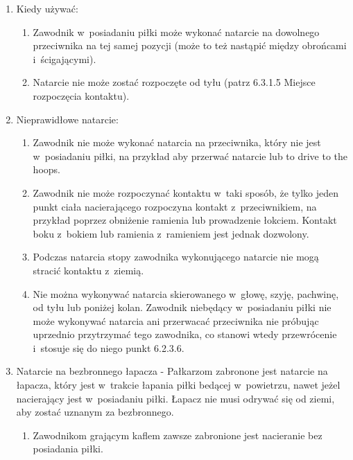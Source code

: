 \documentclass[12pt]{article}
\begin{document}
\begin{enumerate}
	\item
	      Kiedy używać:

	      \begin{enumerate}
		      \item
		            Zawodnik w~posiadaniu piłki może wykonać natarcie na dowolnego
		            przeciwnika na tej samej pozycji (może to też nastąpić między
		            obrońcami i~ścigającymi).
		      \item
		            Natarcie nie może zostać rozpoczęte od tyłu (patrz 6.3.1.5 Miejsce
		            rozpoczęcia kontaktu).
	      \end{enumerate}
	\item
	      Nieprawidłowe natarcie:

	      \begin{enumerate}
		      \item
		            Zawodnik nie może wykonać natarcia na przeciwnika, który nie jest w~posiadaniu piłki, na przykład aby przerwać natarcie lub to drive to
		            the hoops.
		      \item
		            Zawodnik nie może rozpoczynać kontaktu w~taki sposób, że tylko jeden
		            punkt ciała nacierającego rozpoczyna kontakt z~przeciwnikiem, na
		            przykład poprzez obniżenie ramienia lub prowadzenie łokciem. Kontakt
		            boku z~bokiem lub ramienia z~ramieniem jest jednak dozwolony.
		      \item
		            Podczas natarcia stopy zawodnika wykonującego natarcie nie mogą
		            stracić kontaktu z~ziemią.
		      \item
		            Nie można wykonywać natarcia skierowanego w~głowę, szyję, pachwinę,
		            od tyłu lub poniżej kolan. Zawodnik niebędący w~posiadaniu piłki nie
		            może wykonywać natarcia ani przerwacać przeciwnika nie próbując
		            uprzednio przytrzymać tego zawodnika, co stanowi wtedy przewrócenie
		            i~stosuje się do niego punkt 6.2.3.6.
	      \end{enumerate}
	\item
	      Natarcie na bezbronnego łapacza - Pałkarzom zabronone jest natarcie na
	      łapacza, który jest w~trakcie łapania piłki bedącej w~powietrzu, nawet
	      jeżel nacierający jest w~posiadaniu piłki. Łapacz nie musi odrywać się
	      od ziemi, aby zostać uznanym za bezbronnego.

	      \begin{enumerate}
		      \item
		            Zawodnikom grającym kaflem zawsze zabronione jest nacieranie bez
		            posiadania piłki.
	      \end{enumerate}
\end{enumerate}
\end{document}
